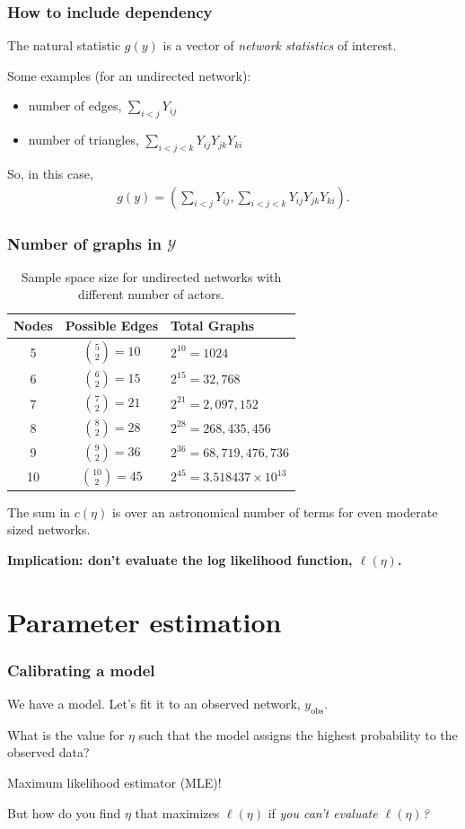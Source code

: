 \documentclass[ 10pt]{beamer}
\def\YY{{\mathcal Y}}
\newcommand{\yobs}{y_{\text{obs}}}
\begin{document}
\frame
{
\frametitle{How to include dependency}
The natural statistic $g(y)$ is a vector of \emph{network statistics} of interest.  
\vspace{2mm}

Some examples (for an undirected network):
\begin{itemize}
	\item number of edges, $\sum_{i<j} Y_{ij}$
	\item number of triangles, $\sum_{i < j < k} Y_{ij}Y_{jk}Y_{ki}$
\end{itemize}
\vspace{2mm}

So, in this case,
\begin{align*}
	g(y) = \left( \sum_{i<j} Y_{ij}, 
					\sum_{i < j < k} Y_{ij}Y_{jk}Y_{ki} \right ).
\end{align*}
}


\frame
{
\frametitle{Number of graphs in $\YY$}
\begin{table}[h] 
\caption{Sample space size for undirected networks with different number of 
actors.}

\begin{tabular}{ccl} 
\hline 
Nodes & Possible Edges & Total Graphs \\ [1ex]
\hline
5 & ${5 \choose 2} = 10$ & $2^{10} = 1024$ \\ [1ex]
6 & ${6 \choose 2} = 15$ & $2^{15} = 32,768$ \\ [1ex]
7 & ${7 \choose 2} = 21$ & $2^{21} = 2,097,152$ \\ [1ex]
8 & ${8 \choose 2} = 28$ & $2^{28} = 268,435,456$ \\ [1ex]
9 & ${9 \choose 2} = 36$ & $2^{36} = 68,719,476,736$ \\ [1ex]
10 & ${10 \choose 2} = 45$ & $2^{45} = 3.518437\times10^{13}$ \\ [1ex]
\hline 
\end{tabular} \label{T:number graphs}
\end{table}
\pause

The sum in $c(\eta)$ is over an astronomical number of terms for 
even moderate sized networks.
\vspace{2mm}

\textbf{Implication: don't evaluate the log likelihood function, $\ell(\eta)$.}
}

\section{Parameter estimation}
\frame
{
\frametitle{Calibrating a model}
We have a model. Let's fit it to an observed network, $\yobs$.
\vspace{3mm}

What is the value for $\eta$ such that the model assigns the highest probability to the observed data?
\vspace{2mm}

Maximum likelihood estimator (MLE)!
\vspace{10mm}

\pause
But how do you find $\eta$ that maximizes $\ell(\eta)$ if \emph{you can't 
evaluate $\ell(\eta)$?}
}
\end{document}
